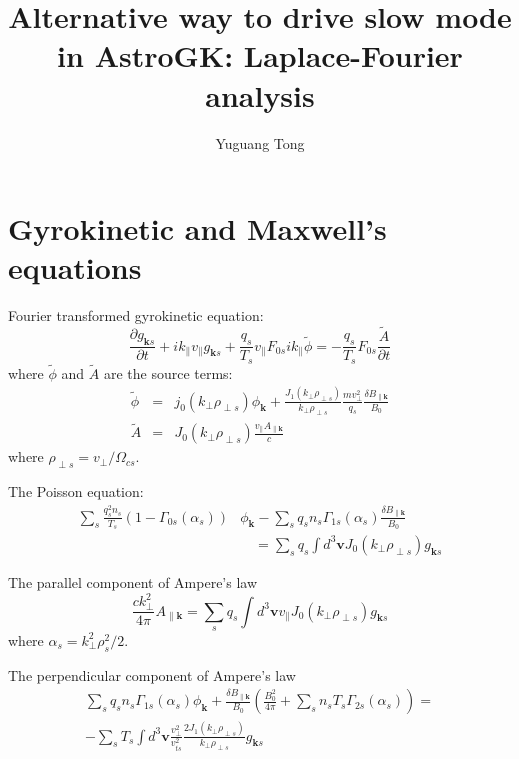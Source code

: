 \documentclass[12pt]{article}
\title{Alternative way to drive slow mode in AstroGK: Laplace-Fourier analysis}
\author{Yuguang Tong}
\begin{document}
\maketitle

\section{Gyrokinetic and Maxwell's equations}
Fourier transformed gyrokinetic equation:
%
\begin{equation}
\frac{\partial g_{\mathbf{k}s}}{\partial t} + i k_\parallel v_\parallel g_{\mathbf{k}s} + \frac{q_s}{T_s} v_\parallel F_{0s} i k_\parallel\tilde{\phi} = -\frac{q_s}{T_s} F_{0s} \frac{\tilde{A}}{\partial{t}}
\label{eq:gk_eq_1}
\end{equation}
%
where $\tilde{\phi}$ and $\tilde{A}$ are the source terms:
%
\begin{eqnarray}
\tilde{\phi} & = & j_0(k_\perp \rho_{\perp s})\phi_\mathbf{k}
 +  \frac{J_1(k_\perp \rho_{\perp s})}{k_\perp \rho_{\perp s}}\frac{mv_\perp^2}{q_s} 
\frac{\delta B_{\parallel\mathbf{k}}}{B_0} \\
\tilde{A} & =& J_0\left( k_\perp \rho_{\perp s}\right) \frac{v_\parallel A_{\parallel\mathbf{k}}}{c}
\end{eqnarray}
%
where $\rho_{\perp s} = v_{\perp}/\Omega_{cs}$. 

The Poisson equation:
\begin{equation}
\begin{split}
\sum_s \frac{q_s^2 n_s}{T_s} (1 - \Gamma_{0s}(\alpha_s)) & \phi_\mathbf{k} - \sum_s q_s n_s \Gamma_{1s} (\alpha_s) \frac{\delta B_{\parallel \mathbf{k}}}{B_0} \\
&\quad  = \sum_s q_s \int d^3 \mathbf{v} J_0(k_\perp \rho_{\perp s}) g_{\mathbf{k}s}
\end{split}
\label{eq:poisson_eq_1}
\end{equation}

The parallel component of Ampere's law
\begin{equation}
\frac{ck_\perp^2}{4\pi} A_{\parallel\mathbf{k}} = \sum_s q_s \int d^3\mathbf{v} v_\parallel J_0(k_\perp \rho_{\perp s}) g_{\mathbf{k}s}
\label{eq:par_ampere_1}
\end{equation}
where $\alpha_s = k_\perp^2 \rho_s^2/2$.

The perpendicular component of Ampere's law
\begin{equation}
\begin{split}
\sum_s q_s n_s \Gamma_{1s}(\alpha_s) \phi_\mathbf{k} +  \frac{\delta B_{\parallel \mathbf{k}}}{B_0} \left( \frac{B_0^2}{4\pi} + \sum_s n_sT_s\Gamma_{2s}(\alpha_s)\right) = \\
-\sum_s T_s \int d^3\mathbf{v} \frac{v_\perp^2}{v_{ts}^2}\frac{2J_1(k_\perp \rho_{\perp s})}{k_\perp \rho_{\perp s}} g_{\mathbf{k}s}
\end{split}
\label{eq:perp_ampere_1}
\end{equation}
\end{document}

